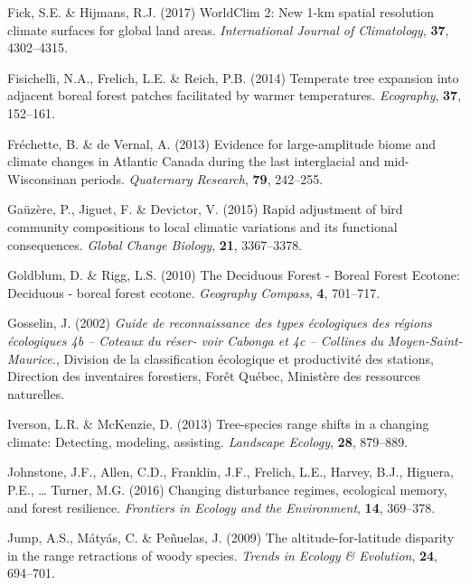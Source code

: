 \documentclass[a4paperpaper,]{article}
\begin{document}
\leavevmode\hypertarget{ref-fick_worldclim_2017}{}%
Fick, S.E. \& Hijmans, R.J. (2017) WorldClim 2: New 1-km spatial
resolution climate surfaces for global land areas. \emph{International
Journal of Climatology}, \textbf{37}, 4302--4315.

\leavevmode\hypertarget{ref-fisichelli_temperate_2014}{}%
Fisichelli, N.A., Frelich, L.E. \& Reich, P.B. (2014) Temperate tree
expansion into adjacent boreal forest patches facilitated by warmer
temperatures. \emph{Ecography}, \textbf{37}, 152--161.

\leavevmode\hypertarget{ref-frechette_evidence_2013}{}%
Fréchette, B. \& de Vernal, A. (2013) Evidence for large-amplitude biome
and climate changes in Atlantic Canada during the last interglacial and
mid-Wisconsinan periods. \emph{Quaternary Research}, \textbf{79},
242--255.

\leavevmode\hypertarget{ref-gauzere_rapid_2015}{}%
Gaüzère, P., Jiguet, F. \& Devictor, V. (2015) Rapid adjustment of bird
community compositions to local climatic variations and its functional
consequences. \emph{Global Change Biology}, \textbf{21}, 3367--3378.

\leavevmode\hypertarget{ref-goldblum_deciduous_2010}{}%
Goldblum, D. \& Rigg, L.S. (2010) The Deciduous Forest - Boreal Forest
Ecotone: Deciduous - boreal forest ecotone. \emph{Geography Compass},
\textbf{4}, 701--717.

\leavevmode\hypertarget{ref-gosselin_guide_2002}{}%
Gosselin, J. (2002) \emph{Guide de reconnaissance des types écologiques
des régions écologiques 4b -- Coteaux du réser- voir Cabonga et 4c --
Collines du Moyen-Saint-Maurice.}, Division de la classification
écologique et productivité des stations, Direction des inventaires
forestiers, Forêt Québec, Ministère des ressources naturelles.

\leavevmode\hypertarget{ref-iverson_tree-species_2013}{}%
Iverson, L.R. \& McKenzie, D. (2013) Tree-species range shifts in a
changing climate: Detecting, modeling, assisting. \emph{Landscape
Ecology}, \textbf{28}, 879--889.

\leavevmode\hypertarget{ref-johnstone_changing_2016}{}%
Johnstone, J.F., Allen, C.D., Franklin, J.F., Frelich, L.E., Harvey,
B.J., Higuera, P.E., \ldots{} Turner, M.G. (2016) Changing disturbance
regimes, ecological memory, and forest resilience. \emph{Frontiers in
Ecology and the Environment}, \textbf{14}, 369--378.

\leavevmode\hypertarget{ref-jump_altitude-for-latitude_2009}{}%
Jump, A.S., Mátyás, C. \& Peñuelas, J. (2009) The altitude-for-latitude
disparity in the range retractions of woody species. \emph{Trends in
Ecology \& Evolution}, \textbf{24}, 694--701.
\end{document}
